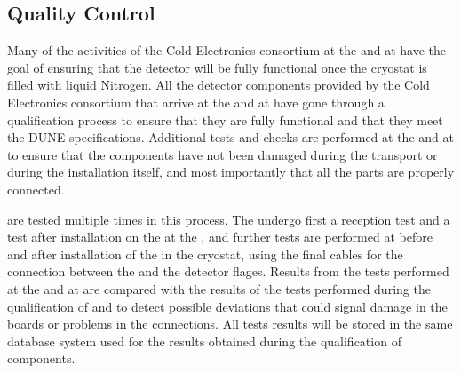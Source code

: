 
\subsection{Quality Control}
\label{sec:fdsp-tpcelec-integration-qc}

Many of the activities of the Cold Electronics
consortium at the  and at \surf have the goal of 
ensuring that the detector will be fully functional once the cryostat
is filled with liquid Nitrogen. All the detector components provided
by the Cold Electronics consortium that arrive at the 
and at \surf have gone through a qualification process to ensure
that they are fully functional and that they meet the DUNE 
specifications. Additional tests and checks are performed at the
 and at \surf to ensure that the components have not
been damaged during the transport or during the installation itself,
and most importantly that all the parts are properly connected.

 are tested multiple times in this process. 
The  undergo first a reception test and a test after 
installation on the  at the , and further 
tests are performed at \surf before and after installation of the 
 in the cryostat, using the final cables for the 
connection between the  and the detector flages. 
Results from the tests performed at
the  and at \surf are compared with the results of the
tests performed during the qualification of  and
 to detect possible deviations that could signal 
damage in the boards or problems in the connections. All tests 
results will be stored in the same database system used for
the results obtained during the qualification of components.

